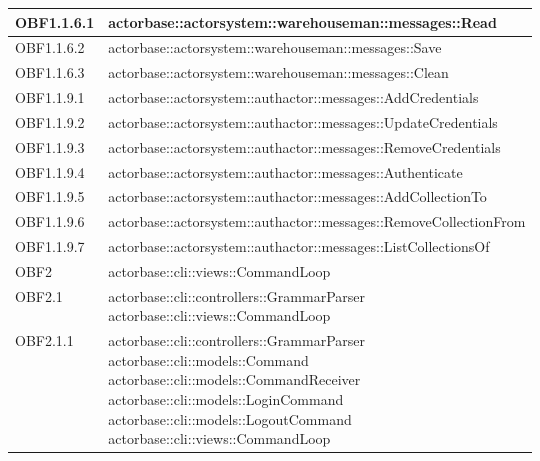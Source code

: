 \documentclass{scalatekids-article}
\begin{document}
\begin{longtable}[H]{|p{5cm}|p{12cm}|}
\hline
OBF1.1.6.1 & \multiLineCell[t]{actorbase::actorsystem::warehouseman::messages::Read\\}\\
\hline
OBF1.1.6.2 & \multiLineCell[t]{actorbase::actorsystem::warehouseman::messages::Save\\}\\
\hline
OBF1.1.6.3 & \multiLineCell[t]{actorbase::actorsystem::warehouseman::messages::Clean\\}\\
\hline
OBF1.1.9.1 & \multiLineCell[t]{actorbase::actorsystem::authactor::messages::AddCredentials\\}\\
\hline
OBF1.1.9.2 & \multiLineCell[t]{actorbase::actorsystem::authactor::messages::UpdateCredentials\\}\\
\hline
OBF1.1.9.3 & \multiLineCell[t]{actorbase::actorsystem::authactor::messages::RemoveCredentials\\}\\
\hline
OBF1.1.9.4 & \multiLineCell[t]{actorbase::actorsystem::authactor::messages::Authenticate\\}\\
\hline
OBF1.1.9.5 & \multiLineCell[t]{actorbase::actorsystem::authactor::messages::AddCollectionTo\\}\\
\hline
OBF1.1.9.6 & \multiLineCell[t]{actorbase::actorsystem::authactor::messages::RemoveCollectionFrom\\}\\
\hline
OBF1.1.9.7 & \multiLineCell[t]{actorbase::actorsystem::authactor::messages::ListCollectionsOf\\}\\
\hline
OBF2 & \multiLineCell[t]{actorbase::cli::views::CommandLoop\\}\\
\hline
OBF2.1 & \multiLineCell[t]{actorbase::cli::controllers::GrammarParser\\actorbase::cli::views::CommandLoop\\}\\
\hline
OBF2.1.1 & \multiLineCell[t]{actorbase::cli::controllers::GrammarParser\\actorbase::cli::models::Command\\actorbase::cli::models::CommandReceiver\\actorbase::cli::models::LoginCommand\\actorbase::cli::models::LogoutCommand\\actorbase::cli::views::CommandLoop\\}\\

\end{longtable}
\end{document}
